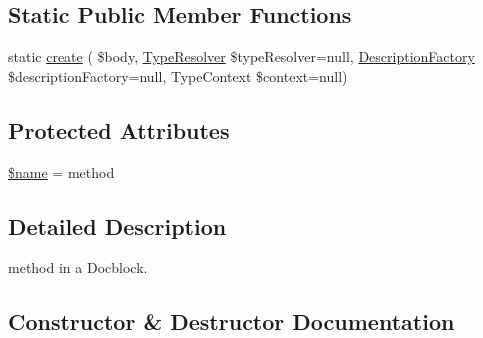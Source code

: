 \subsection*{Static Public Member Functions}
\begin{DoxyCompactItemize}
\item 
static \mbox{\hyperlink{classphp_documentor_1_1_reflection_1_1_doc_block_1_1_tags_1_1_method_a01b1e5c3741d05766720d8cb6d900172}{create}} ( \$body, \mbox{\hyperlink{classphp_documentor_1_1_reflection_1_1_type_resolver}{Type\+Resolver}} \$type\+Resolver=null, \mbox{\hyperlink{classphp_documentor_1_1_reflection_1_1_doc_block_1_1_description_factory}{Description\+Factory}} \$description\+Factory=null, Type\+Context \$context=null)
\end{DoxyCompactItemize}
\subsection*{Protected Attributes}
\begin{DoxyCompactItemize}
\item 
\mbox{\hyperlink{classphp_documentor_1_1_reflection_1_1_doc_block_1_1_tags_1_1_method_ab2fc40d43824ea3e1ce5d86dee0d763b}{\$name}} = \textquotesingle{}method\textquotesingle{}
\end{DoxyCompactItemize}


\subsection{Detailed Description}
method in a Docblock. 

\subsection{Constructor \& Destructor Documentation}
\mbox{\label{classphp_documentor_1_1_reflection_1_1_doc_block_1_1_tags_1_1_method_a27f6acee473305c45852767d76320e97}} 
